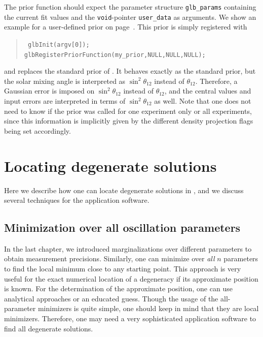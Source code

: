 The prior function should expect the parameter structure {\tt glb\_params} containing the
current fit values and the {\tt void}-pointer {\tt user\_data} as arguments.
We show an example for a user-defined prior on page~\pageref{ex:userprior}. This prior
is simply registered with
\begin{quote}
{\tt
 glbInit(argv[0]); \\
 glbRegisterPriorFunction(my\_prior,NULL,NULL,NULL);
}
\end{quote}
and replaces the standard prior of \GLOBES . It behaves exactly as the standard prior, but
the solar mixing angle is interpreted as $\sin^2 \theta_{12}$ instead of $\theta_{12}$. Therefore,
a Gaussian error is imposed on $\sin^2 \theta_{12}$ instead of $\theta_{12}$, and the central
values and input errors are interpreted in terms of $\sin^2 \theta_{12}$ as well. Note that
one does not need to know if the prior was called for one experiment only or all experiments,
since this information is implicitly given by the different density projection flags being set
accordingly. 

\chapter{Locating degenerate solutions}

Here we describe how one can locate degenerate solutions in \GLOBES , and we discuss
several techniques for the application software.

\section{Minimization over all oscillation parameters}

In the last chapter, we introduced marginalizations over different parameters to obtain measurement precisions. Similarly, one can minimize over {\em all} $n$ parameters to find the local minimum close to any starting point. This approach is very useful for the exact numerical location of a degeneracy if its approximate position is known. For the determination of the approximate position, one can use analytical approaches or an educated guess. 
Though the usage of the all-parameter minimizers is quite simple, one should keep in mind that they are local minimizers. Therefore, one may need a very sophisticated application software to find all degenerate solutions.

